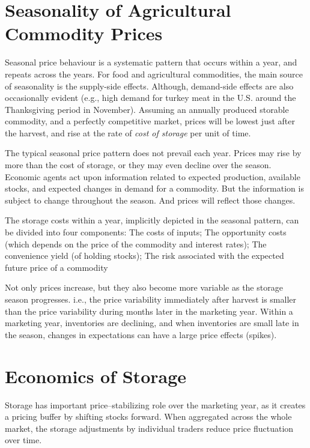 \documentclass[
]{book}
\begin{document}
\hypertarget{seasonality-of-agricultural-commodity-prices}{%
\section{Seasonality of Agricultural Commodity Prices}\label{seasonality-of-agricultural-commodity-prices}}

Seasonal price behaviour is a systematic pattern that occurs within a year, and repeats across the years. For food and agricultural commodities, the main source of seasonality is the supply-side effects. Although, demand-side effects are also occasionally evident (e.g., high demand for turkey meat in the U.S. around the Thanksgiving period in November). Assuming an annually produced storable commodity, and a perfectly competitive market, prices will be lowest just after the harvest, and rise at the rate of \emph{cost of storage} per unit of time.

The typical seasonal price pattern does not prevail each year. Prices may rise by more than the cost of storage, or they may even decline over the season. Economic agents act upon information related to expected production, available stocks, and expected changes in demand for a commodity. But the information is subject to change throughout the season. And prices will reflect those changes.

The storage costs within a year, implicitly depicted in the seasonal pattern, can be divided into four components: The costs of inputs; The opportunity costs (which depends on the price of the commodity and interest rates); The convenience yield (of holding stocks); The risk associated with the expected future price of a commodity

Not only prices increase, but they also become more variable as the storage season progresses. i.e., the price variability immediately after harvest is smaller than the price variability during months later in the marketing year. Within a marketing year, inventories are declining, and when inventories are small late in the season, changes in expectations can have a large price effects (spikes).

\hypertarget{economics-of-storage}{%
\section{Economics of Storage}\label{economics-of-storage}}

Storage has important price--stabilizing role over the marketing year, as it creates a pricing buffer by shifting stocks forward. When aggregated across the whole market, the storage adjustments by individual traders reduce price fluctuation over time.
\end{document}
